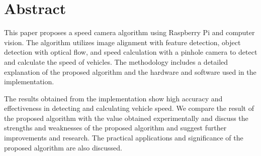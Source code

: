 \chapter*{Abstract}

This paper proposes a speed camera algorithm using Raspberry Pi and computer vision. The algorithm utilizes image alignment with feature detection, object detection with optical flow, and speed calculation with a pinhole camera to detect and calculate the speed of vehicles. The methodology includes a detailed explanation of the proposed algorithm and the hardware and software used in the implementation.

The results obtained from the implementation show high accuracy and effectiveness in detecting and calculating vehicle speed. We compare the result of the proposed algorithm with the value obtained experimentally and discuss the strengths and weaknesses of the proposed algorithm and suggest further improvements and research. The practical applications and significance of the proposed algorithm are also discussed.